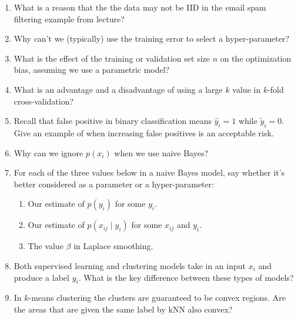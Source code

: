 \documentclass{article}
\begin{document}
    \begin{enumerate}
        \item What is a reason that the the data may not be IID in the email spam filtering example from lecture?
        
        \item Why can't we (typically) use the training error to select a hyper-parameter?

        \item What is the effect of the training or validation set size $n$ on the optimization bias, assuming we use a parametric model?

        \item What is an advantage and a disadvantage of using a large $k$ value in $k$-fold cross-validation?

        \item Recall that false positive in binary classification means $\hat y_i=1$ while $\tilde y_i = 0$. Give an example of when increasing false positives is an acceptable risk.

        \item Why can we ignore $p(x_i)$ when we use naive Bayes?

        \item For each of the three values below in a naive Bayes model, say whether it's better considered as a parameter or a hyper-parameter:
        \begin{enumerate}
            \item Our estimate of $p(y_i)$ for some $y_i$.
            \item Our estimate of $p(x_{ij} \mid y_i)$ for some $x_{ij}$ and $y_i$.
            \item The value $\beta$ in Laplace smoothing.
        \end{enumerate}

        \item Both supervised learning and clustering models take in an input $x_i$ and produce a label $y_i$. What is the key difference between these types of models?

        \item In $k$-means clustering the clusters are guaranteed to be convex regions. Are the areas that are given the same label by kNN also convex?
    \end{enumerate}
\end{document}
